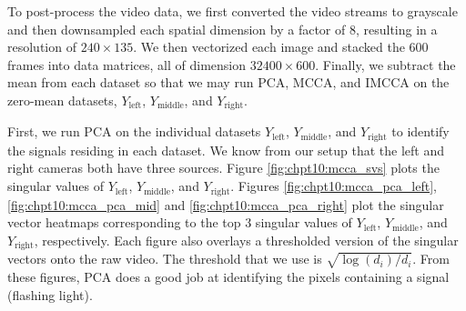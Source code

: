 To post-process the video data, we first converted the video streams to grayscale and then
downsampled each spatial dimension by a factor of 8, resulting in a resolution of $240\times
135$. We then vectorized each image and stacked the 600 frames into data matrices, all
of dimension $32400 \times 600$. Finally, we subtract the mean from each dataset so that
we may run PCA, MCCA, and IMCCA on the zero-mean datasets, $Y_{\text{left}}$,
$Y_{\text{middle}}$, and $Y_{\text{right}}$.

First, we run PCA on the individual datasets $Y_{\text{left}}$, $Y_{\text{middle}}$, and
$Y_{\text{right}}$ to identify the signals residing in each dataset. We know from our
setup that the left and right cameras both have three sources. Figure
\ref{fig:chpt10:mcca_svs} plots the singular values of $Y_{\text{left}}$,
$Y_{\text{middle}}$, and $Y_{\text{right}}$. Figures \ref{fig:chpt10:mcca_pca_left},
\ref{fig:chpt10:mcca_pca_mid} and \ref{fig:chpt10:mcca_pca_right} plot the singular vector
heatmaps corresponding to the top 3 singular values of $Y_{\text{left}}$,
$Y_{\text{middle}}$, and $Y_{\text{right}}$, respectively. Each figure also overlays a
thresholded version of the singular vectors onto the raw video. The threshold that we use
is $\sqrt{\log(d_i)/d_i}$. From these figures, PCA does a good job at identifying the pixels
containing a signal (flashing light).

